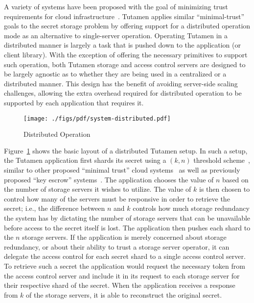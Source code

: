 A variety of systems have been proposed with the goal of minimizing
trust requirements for cloud infrastructure~\cite{bessani2011,
  kallahalla2003, kubiatowicz2000, mahajan2011,
  wilcox-o'hearn2008}. Tutamen applies similar ``minimal-trust'' goals
to the secret storage problem by offering support for a distributed
operation mode as an alternative to single-server operation. Operating
Tutamen in a distributed manner is largely a task that is pushed down
to the application (or client library). With the exception of offering
the necessary primitives to support such operation, both Tutamen
storage and access control servers are designed to be largely agnostic
as to whether they are being used in a centralized or a distributed
manner. This design has the benefit of avoiding server-side scaling
challenges, allowing the extra overhead required for distributed
operation to be supported by each application that requires it.

\begin{figure}[th]
  \centering
  \texttt{[image: ./figs/pdf/system-distributed.pdf]}
  \caption{Distributed Operation}
  \label{fig:tutamen:systemdistributed}
\end{figure}

Figure~\ref{fig:tutamen:systemdistributed} shows the basic layout of a
distributed Tutamen setup. In such a setup, the Tutamen application
first shards its secret using a $(k, n)$ threshold
scheme~\cite{krawczyk1993, shamir1979}, similar to other proposed
``minimal trust'' cloud systems~\cite{bessani2011} as well as
previously proposed ``key escrow'' systems~\cite{blaze1996,
  denning1996}. The application chooses the value of $n$ based on the
number of storage servers it wishes to utilize. The value of $k$ is
then chosen to control how many of the servers must be responsive in
order to retrieve the secret; i.e., the difference between $n$ and
$k$ controls how much storage redundancy the system has by dictating
the number of storage servers that can be unavailable before access to
the secret itself is lost. The application then pushes each shard to
the $n$ storage servers. If the application is merely concerned about
storage redundancy, or about their ability to trust a storage server
operator, it can delegate the access control for each secret shard to
a single access control server. To retrieve such a secret the
application would request the necessary token from the access control
server and include it in its request to each storage server for their
respective shard of the secret. When the application receives a
response from $k$ of the storage servers, it is able to reconstruct
the original secret.

